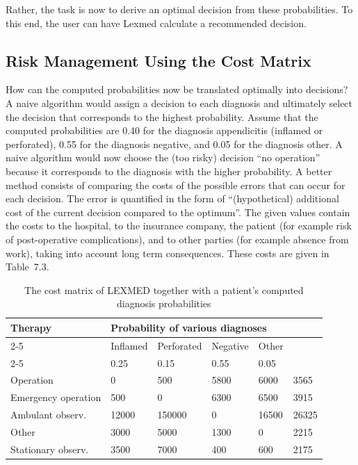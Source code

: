 \documentclass[10pt]{book}
\begin{document}
Rather, the task is now to derive an optimal decision from these probabilities. To this end, the user can have Lexmed calculate a recommended decision.

\subsection{Risk Management Using the Cost Matrix}
How can the computed probabilities now be translated optimally into decisions? A naive algorithm would assign a decision to each diagnosis and ultimately select the decision that corresponds to the highest probability. Assume that the computed probabilities are 0.40 for the diagnosis appendicitis (inflamed or perforated), 0.55 for the diagnosis negative, and 0.05 for the diagnosis other. A naive algorithm would now choose the (too risky) decision ``no operation'' because it corresponds to the diagnosis with the higher probability. A better method consists of comparing the costs of the possible errors that can occur for each decision. The error is quantified in the form of ``(hypothetical) additional cost of the current decision compared to the optimum''. The given values contain the costs to the hospital, to the insurance company, the patient (for example risk of post-operative complications), and to other parties (for example absence from work), taking into account long term consequences. These costs are given in Table~7.3.

\begin{table}[t]
\centering
\caption{The cost matrix of LEXMED together with a patient's computed diagnosis probabilities}
\begin{tabular}{|l|l|l|l|l|l|}
\hline
\multirow[t]{3}{*}{Therapy} & \multicolumn{4}{|l|}{Probability of various diagnoses} & \multirow{3}{*}{} \\
\cline{2-5}
 & Inflamed & Perforated & Negative & Other &  \\
\cline{2-5}
 & 0.25 & 0.15 & 0.55 & 0.05 &  \\
\hline
Operation & 0 & 500 & 5800 & 6000 & 3565 \\
\hline
Emergency operation & 500 & 0 & 6300 & 6500 & 3915 \\
\hline
Ambulant observ. & 12000 & 150000 & 0 & 16500 & 26325 \\
\hline
Other & 3000 & 5000 & 1300 & 0 & 2215 \\
\hline
Stationary observ. & 3500 & 7000 & 400 & 600 & 2175 \\
\hline
\end{tabular}
\end{table}
\end{document}
